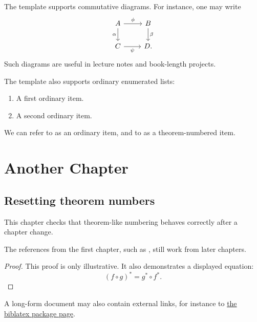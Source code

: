 \documentclass[12pt,a4paper]{report}
\begin{document}
The template supports commutative diagrams. For instance, one may write
\[
\begin{tikzcd}
  A \arrow[r, "\phi"] \arrow[d, "\alpha"'] &
  B \arrow[d, "\beta"] \\
  C \arrow[r, "\psi"'] &
  D .
\end{tikzcd}
\]
Such diagrams are useful in lecture notes and book-length projects.

The template also supports ordinary enumerated lists:
\begin{enumerate}[label=(\alph*), ref=(\alph*)]
  \item A first ordinary item.
    \label{item:longform-ordinary-first} 
  \item A second ordinary item.
    \label{item:longform-ordinary-second} 
\end{enumerate}
We can refer to  as an ordinary item, and
to  as a theorem-numbered item.

\chapter{Another Chapter}

\section{Resetting theorem numbers}

This chapter checks that theorem-like numbering behaves correctly after a
chapter change.

\begin{lemma}
  \label{lemma:second-chapter}
  The references from the first chapter, such as
  , still work from later chapters.
\end{lemma}

\begin{proof}
  This proof is only illustrative. It also demonstrates a displayed equation:
  \begin{equation}
    \label{equation:pull-back}
    (f \circ g)^* = g^* \circ f^* .
  \end{equation}
\end{proof}

\begin{example}
  \label{example:external-link}
  A long-form document may also contain external links, for instance to
  \href{https://www.ctan.org/pkg/biblatex}{the biblatex package page}.
\end{example}

\printbibliography
\end{document}
